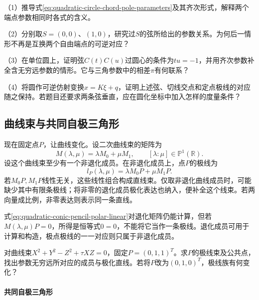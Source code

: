 \begin{exercise}
\mbox{}\par\nobreak

（1）推导式\eqref{eq:quadratic-circle-chord-pole-parameters}及其齐次形式，解释两个端点参数相同时各式的含义。

（2）分别取\(S=(0,0)\)、\((1,0)\)，研究过\(S\)的弦所给出的参数关系。为何后一情形不再是互换两个自由端点的可逆对应？

（3）在单位圆上，证明弦\(C(t)C(u)\)过圆心的条件为\(tu=-1\)，并用齐次参数补全含无穷远参数的情形。它与三角参数中的相差\(\pi\)有何联系？

（4）将圆作可逆仿射变换\(x=K\xi+q\)，证明上述弦、切线交点和定点极线的对应随之保持。若题目还要求两条弦垂直，应在圆化坐标中加入怎样的度量条件？
\end{exercise}

\subsection{曲线束与共同自极三角形}
\label{subsec:quadratic-conic-pencil-polar-pencil}

现在固定点\(P\)，让曲线变化。设二次曲线束的矩阵为
\begin{equation*}
 M(\lambda,\mu)=\lambda M_0+\mu M_1,
 \qquad[\lambda:\mu]\in\mathbb P^1(\mathbb R).
\end{equation*}
设这个曲线束至少有一个非退化成员。在非退化成员上，点\(P\)的极线为
\begin{equation}\label{eq:quadratic-conic-pencil-polar-linear}
 l_P(\lambda,\mu)=\lambda M_0P+\mu M_1P.
\end{equation}
若\(M_0P,M_1P\)线性无关，这些线性组合构成直线束。仅取非退化曲线成员时，可能缺少其中有限条极线；将非零的退化成员极化表达也纳入，便补全这个线束。若两向量成比例，非零表达则表示同一条直线。

式\eqref{eq:quadratic-conic-pencil-polar-linear}对退化矩阵仍能计算，但若\(M(\lambda,\mu)P=0\)，所得是恒等式\(0=0\)，不能将它当作一条极线。退化成员可用于计算和构造，极点极线的一一对应则只属于非退化成员。

\begin{example}
对曲线束\(X^2+Y^2-Z^2+\tau XZ=0\)，固定\(P=(0,1,1)^T\)。求\(P\)的极线束及公共点，找出参数无穷远所对应的成员与极化直线。若将\(P\)改为\((0,1,0)^T\)，极线族有何变化？
\end{example}

\paragraph{共同自极三角形} \mbox{}

